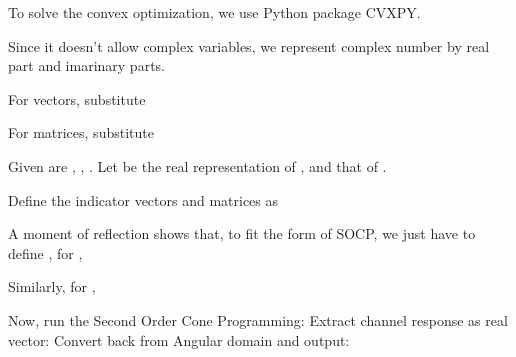 {
\I To solve the convex optimization, we use Python package CVXPY.

\I Since it doesn't allow complex variables, we represent complex number by real part and imarinary parts.

\I For vectors, substitute

\I For matrices, substitute
}
{
\I Given are , , .
Let  be the real representation of , and  that of .

\I Define the indicator vectors and matrices as
}
{
\I A moment of reflection shows that, to fit the form of SOCP, we just have to define , for ,

\I Similarly, for ,
}
{
\I Now, run the Second Order Cone Programming:
\I Extract channel response as real vector:
\I Convert back from Angular domain and output:
}

